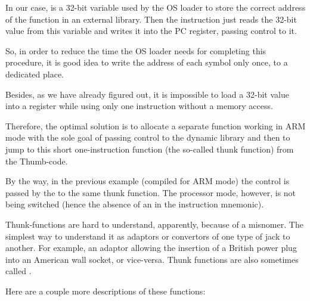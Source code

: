 In our case,  is a 32-bit variable used by the \ac{OS} loader to store the correct address of the function in an external library. 
Then the  instruction just reads the 32-bit value from this variable and writes it into the \ac{PC} register, passing control to it.

So, in order to reduce the time the \ac{OS} loader needs for completing this procedure, 
it is good idea to write the address of each symbol only once, to a dedicated place.

Besides, as we have already figured out, it is impossible to load a 32-bit value into a register 
while using only one instruction without a memory access.

Therefore, the optimal solution is to allocate a separate function working in ARM mode with the sole 
goal of passing control to the dynamic library and then to jump to this short one-instruction function (the so-called \gls{thunk function}) from the Thumb-code.

By the way, in the previous example (compiled for ARM mode) the control is passed by the  to the 
same \gls{thunk function}.
The processor mode, however, is not being switched (hence the absence of an  in the instruction mnemonic).


Thunk-functions are hard to understand, apparently, because of a misnomer.
The simplest way to understand it as adaptors or convertors of one type of jack to another.
For example, an adaptor allowing the insertion of a British power plug into an American wall socket, or vice-versa. 
Thunk functions are also sometimes called .

Here are a couple more descriptions of these functions:

